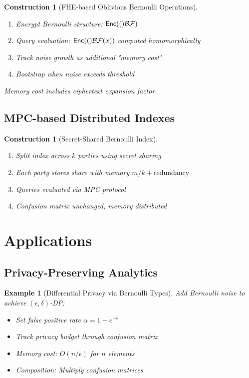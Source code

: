 \documentclass[11pt,final]{article}
\newtheorem{example}[theorem]{Example}
\newtheorem{construction}[theorem]{Construction}
\begin{document}
\begin{construction}[FHE-based Oblivious Bernoulli Operations]
\begin{enumerate}
    \item Encrypt Bernoulli structure: $\mathsf{Enc}(()\mathcal{BF})$
    \item Query evaluation: $\mathsf{Enc}(()\mathcal{BF}(x))$ computed homomorphically
    \item Track noise growth as additional "memory cost"
    \item Bootstrap when noise exceeds threshold
\end{enumerate}
Memory cost includes ciphertext expansion factor.
\end{construction}

\subsection{MPC-based Distributed Indexes}

\begin{construction}[Secret-Shared Bernoulli Index]
\begin{enumerate}
    \item Split index across $k$ parties using secret sharing
    \item Each party stores share with memory $m/k + \text{redundancy}$
    \item Queries evaluated via MPC protocol
    \item Confusion matrix unchanged, memory distributed
\end{enumerate}
\end{construction}

\section{Applications}

\subsection{Privacy-Preserving Analytics}

\begin{example}[Differential Privacy via Bernoulli Types]
Add Bernoulli noise to achieve $(\epsilon, \delta)$-DP:
\begin{itemize}
    \item Set false positive rate $\alpha = 1 - e^{-\epsilon}$
    \item Track privacy budget through confusion matrix
    \item Memory cost: $O(n/\epsilon)$ for $n$ elements
    \item Composition: Multiply confusion matrices
\end{itemize}
\end{example}
\end{document}
